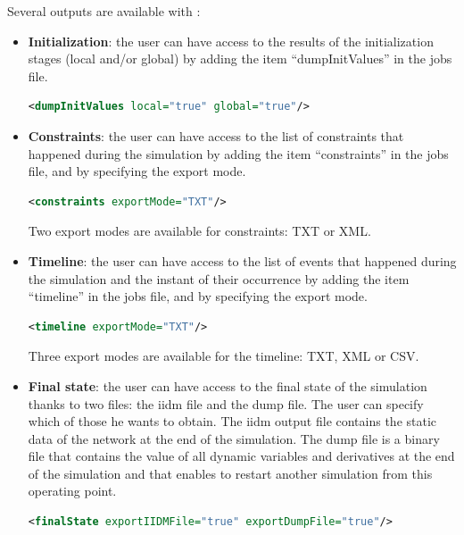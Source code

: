 \documentclass[a4paper, 12pt]{report}
\begin{document}
Several outputs are available with \Dynawo:
\begin{itemize}
\item \textbf{Initialization}: the user can have access to the results of the initialization stages (local and/or global) by adding the item ``dumpInitValues'' in the jobs file.

\begin{lstlisting}[language=XML, morekeywords={dumpInitValues},numbers=none]
<dumpInitValues local="true" global="true"/>
\end{lstlisting}

\item \textbf{Constraints}: the user can have access to the list of constraints that happened during the simulation by adding the item ``constraints'' in the jobs file, and by specifying the export mode.
\begin{lstlisting}[language=XML, morekeywords={constraints},numbers=none]
<constraints exportMode="TXT"/>
\end{lstlisting}
Two export modes are available for constraints: TXT or XML.

\item \textbf{Timeline}: the user can have access to the list of events that happened during the simulation and the instant of their occurrence by adding the item ``timeline'' in the jobs file, and by specifying the export mode.

\begin{lstlisting}[language=XML, morekeywords={timeline},numbers=none]
<timeline exportMode="TXT"/>
\end{lstlisting}
Three export modes are available for the timeline: TXT, XML or CSV.

\item \textbf{Final state}: the user can have access to the final state of the simulation thanks to two files: the iidm file and the dump file. The user can specify which of those he wants to obtain. The iidm output file contains the static data of the network at the end of the simulation. The dump file is a binary file that contains the value of all dynamic variables and derivatives at the end of the simulation and that enables to restart another simulation from this operating point.

\begin{lstlisting}[language=XML, morekeywords={finalState},numbers=none]
<finalState exportIIDMFile="true" exportDumpFile="true"/>
\end{lstlisting}


\end{itemize}
\end{document}
